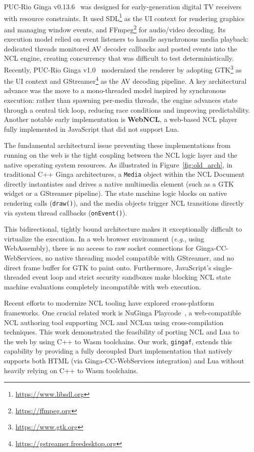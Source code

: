 \documentclass[sigconf,authorversion,review,authordraft]{webmedia}
\newcommand{\projectname}{\texttt{gingaf}}
\begin{document}
PUC-Rio Ginga v0.13.6~\cite{ginga2013,moreno2010conciliando} was designed for early-generation digital TV receivers with resource constraints. It used SDL\footnote{\url{https://www.libsdl.org}} as the UI context for rendering graphics and managing window events, and FFmpeg\footnote{\url{https://ffmpeg.org}} for audio/video decoding. Its execution model relied on event listeners to handle asynchronous media playback: dedicated threads monitored AV decoder callbacks and posted events into the NCL engine, creating concurrency that was difficult to test deterministically. Recently, PUC-Rio Ginga v1.0~\cite{ginga2018,dodsworth2018dynamic} modernized the renderer by adopting GTK\footnote{\url{https://www.gtk.org}} as the UI context and GStreamer\footnote{\url{https://gstreamer.freedesktop.org}} as the AV decoding pipeline. A key architectural advance was the move to a mono-threaded model inspired by synchronous execution: rather than spawning per-media threads, the engine advances state through a central tick loop, reducing race conditions and improving predictability. Another notable early implementation is \textbf{WebNCL}, a web-based NCL player fully implemented in JavaScript that did not support Lua.

The fundamental architectural issue preventing these implementations from running on the web is the tight coupling between the NCL logic layer and the native operating system resources. As illustrated in Figure~\ref{fig:old_arch}, in traditional C++ Ginga architectures, a \texttt{Media} object within the NCL Document directly instantiates and drives a native multimedia element (such as a GTK widget or a GStreamer pipeline). The state machine logic blocks on native rendering calls (\texttt{draw()}), and the media objects trigger NCL transitions directly via system thread callbacks (\texttt{onEvent()}).

This bidirectional, tightly bound architecture makes it exceptionally difficult to virtualize the execution. In a web browser environment (\textit{e.g.}, using WebAssembly), there is no access to raw socket connections for Ginga-CC-WebServices, no native threading model compatible with GStreamer, and no direct frame buffer for GTK to paint onto. Furthermore, JavaScript's single-threaded event loop and strict security sandboxes make blocking NCL state machine evaluations completely incompatible with web execution.

Recent efforts to modernize NCL tooling have explored cross-platform frameworks. One crucial related work is NuGinga Playcode~\cite{nuginga_playcode20}, a web-compatible NCL authoring tool supporting NCL and NCLua using cross-compilation techniques. This work demonstrated the feasibility of porting NCL and Lua to the web by using C++ to Wasm toolchains. Our work, \projectname{}, extends this capability by providing a fully decoupled Dart implementation that natively supports both HTML (via Ginga-CC-WebServices integration) and Lua without heavily relying on C++ to Wasm toolchains.
\end{document}
